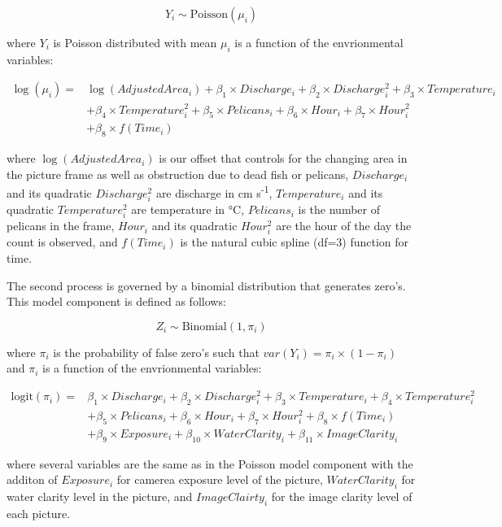 \documentclass[]{article}
\begin{document}
\[Y_i \sim \text{Poisson}(\mu_i)\]

where \(Y_i\) is Poisson distributed with mean \(\mu_i\) is a function
of the envrionmental variables:

\[
\begin{aligned}
\log(\mu_i) = &\log(Adjusted Area_i) + \beta_1 \times Discharge_i + \beta_2 \times Discharge^{2}_i + \beta_3 \times Temperature_i \\
&+ \beta_4 \times Temperature^{2}_i + \beta_5  \times Pelicans_i + \beta_6 \times Hour_i + \beta_7 \times Hour^{2}_i \\
&+ \beta_8 \times f(Time_i)
\end{aligned}
\]

where \(\log(Adjusted Area_i)\) is our offset that controls for the
changing area in the picture frame as well as obstruction due to dead
fish or pelicans, \(Discharge_i\) and its quadratic \(Discharge^{2}_i\)
are discharge in cm s\textsuperscript{-1}, \(Temperature_i\) and its
quadratic \(Temperature^{2}_i\) are temperature in °C, \(Pelicans_i\) is
the number of pelicans in the frame, \(Hour_i\) and its quadratic
\(Hour^{2}_i\) are the hour of the day the count is observed, and
\(f(Time_i)\) is the natural cubic spline (df=3) function for time.

The second process is governed by a binomial distribution that generates
zero's. This model component is defined as follows:

\begin{equation}
Z_i \sim \text{Binomial}(1, \pi_i)
\end{equation}

where \(\pi_i\) is the probability of false zero's such that
\(var(Y_i) = \pi_i \times (1-\pi_i)\) and \(\pi_i\) is a function of the
envrionmental variables:

\[
\begin{aligned}
\text{logit}(\pi_i) = &\beta_1 \times Discharge_i + \beta_2 \times Discharge^{2}_i + \beta_3 \times Temperature_i + \beta_4 \times Temperature^{2}_i \\
&+ \beta_5  \times Pelicans_i + \beta_6 \times Hour_i + \beta_7 \times Hour^{2}_i+ \beta_8 \times f(Time_i) \\ 
&+ \beta_9 \times Exposure_i + \beta_10 \times Water Clarity_i + \beta_11 \times Image Clarity_i
\end{aligned}
\]

where several variables are the same as in the Poisson model component
with the additon of \(Exposure_i\) for camerea exposure level of the
picture, \(Water Clarity_i\) for water clarity level in the picture, and
\(Image Clairty_i\) for the image clarity level of each picture.
\end{document}
